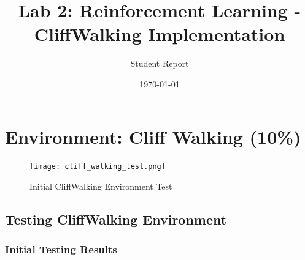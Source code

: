 \documentclass{article}
\title{Lab 2: Reinforcement Learning - CliffWalking Implementation}
\author{Student Report}
\date{\today}
\begin{document}
\maketitle

\section{Environment: Cliff Walking (10\%)}

\begin{figure}[h]
\centering
\texttt{[image: cliff\_walking\_test.png]}
\caption{Initial CliffWalking Environment Test}
\label{fig:cliff_test}
\end{figure}

\subsection{Testing CliffWalking Environment}
\subsubsection{Initial Testing Results}
\end{document}
